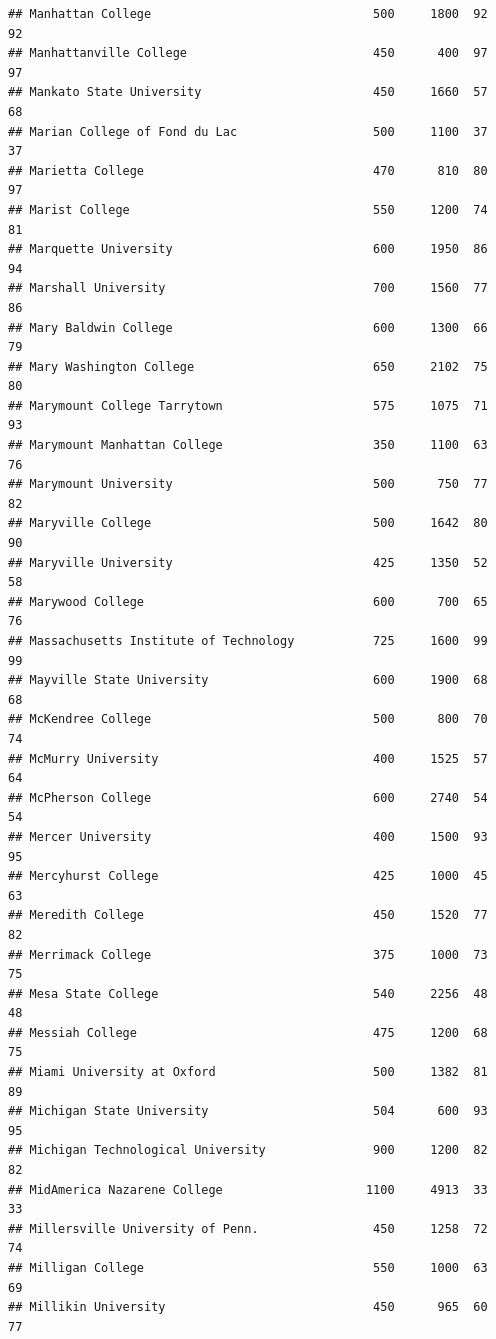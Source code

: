 \documentclass[
]{article}
\begin{document}
\begin{verbatim}
## Manhattan College                               500     1800  92       92
## Manhattanville College                          450      400  97       97
## Mankato State University                        450     1660  57       68
## Marian College of Fond du Lac                   500     1100  37       37
## Marietta College                                470      810  80       97
## Marist College                                  550     1200  74       81
## Marquette University                            600     1950  86       94
## Marshall University                             700     1560  77       86
## Mary Baldwin College                            600     1300  66       79
## Mary Washington College                         650     2102  75       80
## Marymount College Tarrytown                     575     1075  71       93
## Marymount Manhattan College                     350     1100  63       76
## Marymount University                            500      750  77       82
## Maryville College                               500     1642  80       90
## Maryville University                            425     1350  52       58
## Marywood College                                600      700  65       76
## Massachusetts Institute of Technology           725     1600  99       99
## Mayville State University                       600     1900  68       68
## McKendree College                               500      800  70       74
## McMurry University                              400     1525  57       64
## McPherson College                               600     2740  54       54
## Mercer University                               400     1500  93       95
## Mercyhurst College                              425     1000  45       63
## Meredith College                                450     1520  77       82
## Merrimack College                               375     1000  73       75
## Mesa State College                              540     2256  48       48
## Messiah College                                 475     1200  68       75
## Miami University at Oxford                      500     1382  81       89
## Michigan State University                       504      600  93       95
## Michigan Technological University               900     1200  82       82
## MidAmerica Nazarene College                    1100     4913  33       33
## Millersville University of Penn.                450     1258  72       74
## Milligan College                                550     1000  63       69
## Millikin University                             450      965  60       77

\end{verbatim}
\end{document}
